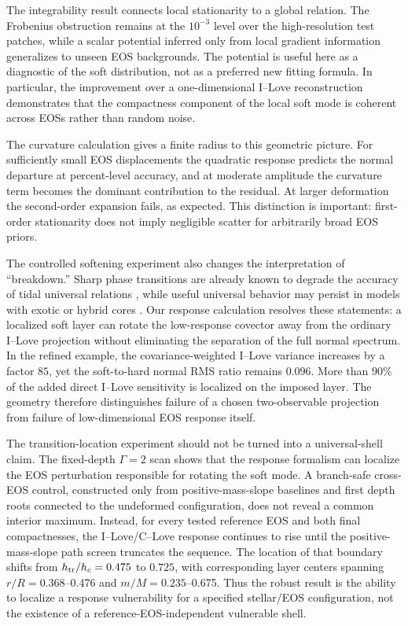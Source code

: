 The integrability result connects local stationarity to a global relation. The Frobenius obstruction remains at the \(10^{-3}\) level over the high-resolution test patches, while a scalar potential inferred only from local gradient information generalizes to unseen EOS backgrounds. The potential is useful here as a diagnostic of the soft distribution, not as a preferred new fitting formula. In particular, the improvement over a one-dimensional I--Love reconstruction demonstrates that the compactness component of the local soft mode is coherent across EOSs rather than random noise.

The curvature calculation gives a finite radius to this geometric picture. For sufficiently small EOS displacements the quadratic response predicts the normal departure at percent-level accuracy, and at moderate amplitude the curvature term becomes the dominant contribution to the residual. At larger deformation the second-order expansion fails, as expected. This distinction is important: first-order stationarity does not imply negligible scatter for arbitrarily broad EOS priors.

The controlled softening experiment also changes the interpretation of ``breakdown.'' Sharp phase transitions are already known to degrade the accuracy of tidal universal relations \cite{han2019phasetransition}, while useful universal behavior may persist in models with exotic or hybrid cores \cite{yip2026elastic}. Our response calculation resolves these statements: a localized soft layer can rotate the low-response covector away from the ordinary I--Love projection without eliminating the separation of the full normal spectrum. In the refined example, the covariance-weighted I--Love variance increases by a factor \(85\), yet the soft-to-hard normal RMS ratio remains \(0.096\). More than \(90\%\) of the added direct I--Love sensitivity is localized on the imposed layer. The geometry therefore distinguishes failure of a chosen two-observable projection from failure of low-dimensional EOS response itself.

The transition-location experiment should not be turned into a universal-shell claim. The fixed-depth \(\Gamma=2\) scan shows that the response formalism can localize the EOS perturbation responsible for rotating the soft mode. A branch-safe cross-EOS control, constructed only from positive-mass-slope baselines and first depth roots connected to the undeformed configuration, does not reveal a common interior maximum. Instead, for every tested reference EOS and both final compactnesses, the I--Love/C--Love response continues to rise until the positive-mass-slope path screen truncates the sequence. The location of that boundary shifts from \(h_{\rm tr}/h_c=0.475\) to \(0.725\), with corresponding layer centers spanning \(r/R=0.368\)--0.476 and \(m/M=0.235\)--0.675. Thus the robust result is the ability to localize a response vulnerability for a specified stellar/EOS configuration, not the existence of a reference-EOS-independent vulnerable shell.

